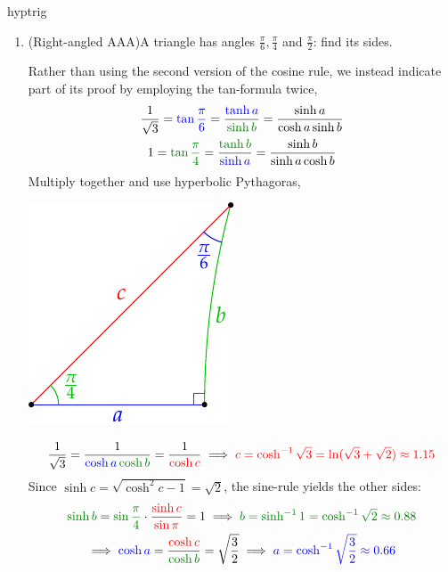 \begin{examples}{}{hyptrig}
\begin{enumerate}
	 	\item\label{ex:rtangleaaa} (Right-angled AAA)\lstsp A triangle has angles $\frac\pi 6,\frac\pi 4$ and $\frac\pi 2$: find its sides.\smallbreak
	  \begin{minipage}[t]{0.71\linewidth}\vspace{-10pt}
	  	Rather than using the second version of the cosine rule, we instead indicate part of its proof by employing the tan-formula twice,
		  \begin{gather*}
		  	\frac 1{\sqrt 3} =\textcolor{blue}{\tan\frac\pi 6} =\frac{\textcolor{blue}{\tanh a}}{\textcolor{Green}{\sinh b}}=\frac{\sinh a}{\cosh a\sinh b}\\
		  	1=\textcolor{Green}{\tan\frac\pi 4}=\frac{\textcolor{Green}{\tanh b}}{\textcolor{blue}{\sinh a}}=\frac{\sinh b}{\sinh a\cosh b}
		  \end{gather*}
		  Multiply together and use hyperbolic Pythagoras,
	  \end{minipage}
	  \hfill
	  \begin{minipage}[t]{0.28\linewidth}\vspace{-20pt}
	  	\flushright\includegraphics{isom-right2}
	  \end{minipage}\par
	  \[
	  	\frac 1{\sqrt 3}=\frac 1{\textcolor{blue}{\cosh a}\,\textcolor{Green}{\cosh b}}=\frac 1{\textcolor{red}{\cosh c}}\implies \textcolor{red}{c=\cosh^{-1}\sqrt 3=\ln(\sqrt 3+\sqrt 2)\approx 1.15}
	  \]
	  Since $\sinh c=\sqrt{\cosh^2c-1}=\sqrt 2$, the sine-rule yields the other sides:
	  \begin{gather*}
		  \textcolor{Green}{\sinh b} =\textcolor{Green}{\sin\frac\pi 4}\cdot\frac{\textcolor{red}{\sinh c}}{\textcolor{red}{\sin\pi}} =1 \implies \textcolor{Green}{b=\sinh^{-1} 1 =\cosh^{-1}\sqrt 2\approx 0.88}\\
		  \implies \textcolor{blue}{\cosh a} =\frac{\textcolor{red}{\cosh c}}{\textcolor{Green}{\cosh b}}=\sqrt{\frac 32} \implies \textcolor{blue}{a=\cosh^{-1}\sqrt{\frac 32}\approx 0.66}
	  \end{gather*}
	  

\end{enumerate}
\end{examples}
